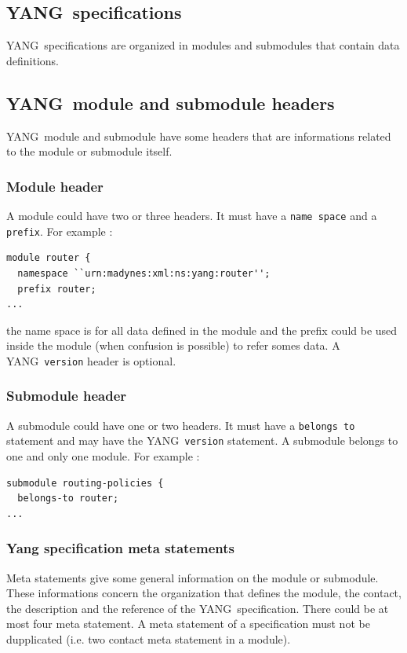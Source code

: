 \documentclass[a4paper]{article}
\newcommand{\y}{YANG}
\begin{document}
\subsection{\y\ specifications}

\y\ specifications are organized in modules and submodules
that contain data definitions. 

\subsection{\y\ module and submodule headers}

\y\  module  and submodule  have  some  headers  that are  informations
related to the module or submodule itself.

\subsubsection{Module header}
\label{spec:module}

A module  could have two or three  headers. It must have  a {\tt name space}
and a  {\tt prefix}.  For
example :

\begin{verbatim}
module router {
  namespace ``urn:madynes:xml:ns:yang:router'';
  prefix router;
...
\end{verbatim}

the name space is for all data defined in the module and the prefix
could be used inside the module (when confusion is possible) to refer
somes data. A \y\ {\tt version} header is optional.

\subsubsection{Submodule header}
\label{spec:submodule}

A submodule could have one or two headers. It must have a {\tt belongs
to} statement and may have the \y\ {\tt version} statement. A
submodule belongs to one and only one module. For example :

\begin{verbatim}
submodule routing-policies {
  belongs-to router;
...
\end{verbatim}


\subsubsection{Yang specification meta statements}

Meta  statements  give some  general  information  on  the module  or
submodule.  These  informations  concern  the  organization  that
defines the module, the contact,  the description and the reference of
the  \y\ specification.   There  could be at most four meta statement.
A meta statement of a  specification must not be dupplicated (i.e. two
contact meta statement in a module).
\end{document}
